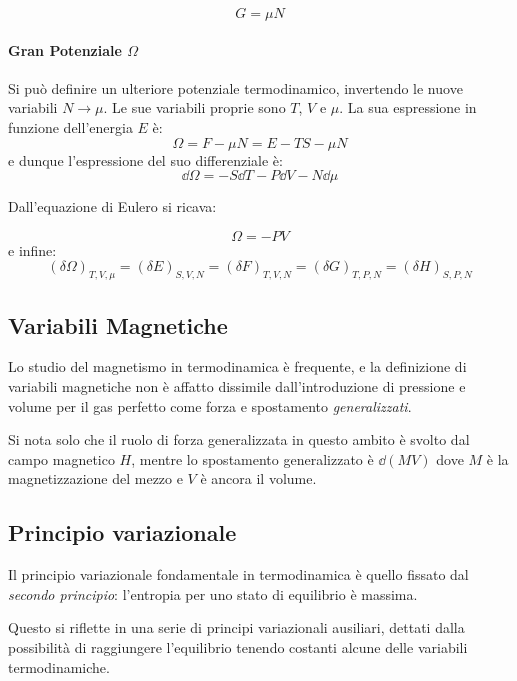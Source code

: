 \begin{equation*}
G = \mu N
\end{equation*}

\paragraph{Gran Potenziale $\Omega$} Si può definire un ulteriore potenziale termodinamico, invertendo le nuove variabili $N \rightarrow \mu$. Le sue variabili proprie sono $T$, $V$ e $\mu$. La sua espressione in funzione dell'energia $E$ è:
\begin{equation*}
\Omega = F - \mu N = E - TS - \mu N
\end{equation*}
e dunque l'espressione del suo differenziale è:
\begin{equation*}
\dd \Omega = - S \dd T - P \dd V - N \dd \mu
\end{equation*}

Dall'equazione di Eulero si ricava:

\begin{equation*}
\Omega = - P V
\end{equation*}
e infine:
\begin{equation*}
(\delta \Omega)_{T, V, \mu} = (\delta E)_{S, V, N} = (\delta F)_{T,V,N} = (\delta G)_{T,P,N} = (\delta H)_{S,P,N}
\end{equation*}


\subsection{Variabili Magnetiche}
Lo studio del magnetismo in termodinamica è frequente, e la definizione di variabili magnetiche non è affatto dissimile dall'introduzione di pressione e volume per il gas perfetto come forza e spostamento \textit{generalizzati}.

Si nota solo che il ruolo di forza generalizzata in questo ambito è svolto dal campo magnetico $ H $, mentre lo spostamento generalizzato è $ \dd (M V) $ dove $M$ è la magnetizzazione del mezzo e $V$ è ancora il volume.

\subsection{Principio variazionale}
Il principio variazionale fondamentale in termodinamica è quello fissato dal \textit{secondo principio}: l'entropia per uno stato di equilibrio è massima.

Questo si riflette in una serie di principi variazionali ausiliari, dettati dalla possibilità di raggiungere l'equilibrio tenendo costanti alcune delle variabili termodinamiche.

